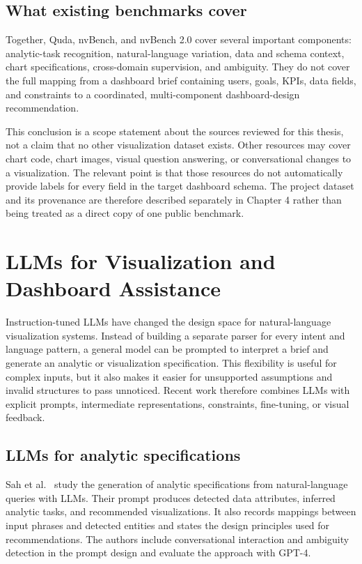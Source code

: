 \subsection{What existing benchmarks cover}

Together, Quda, nvBench, and nvBench 2.0 cover several important components: analytic-task recognition, natural-language variation, data and schema context, chart specifications, cross-domain supervision, and ambiguity. They do not cover the full mapping from a dashboard brief containing users, goals, KPIs, data fields, and constraints to a coordinated, multi-component dashboard-design recommendation.

This conclusion is a scope statement about the sources reviewed for this thesis, not a claim that no other visualization dataset exists. Other resources may cover chart code, chart images, visual question answering, or conversational changes to a visualization. The relevant point is that those resources do not automatically provide labels for every field in the target dashboard schema. The project dataset and its provenance are therefore described separately in Chapter 4 rather than being treated as a direct copy of one public benchmark.

\section{LLMs for Visualization and Dashboard Assistance}

Instruction-tuned LLMs have changed the design space for natural-language visualization systems. Instead of building a separate parser for every intent and language pattern, a general model can be prompted to interpret a brief and generate an analytic or visualization specification. This flexibility is useful for complex inputs, but it also makes it easier for unsupported assumptions and invalid structures to pass unnoticed. Recent work therefore combines LLMs with explicit prompts, intermediate representations, constraints, fine-tuning, or visual feedback.

\subsection{LLMs for analytic specifications}

Sah et al.~\cite{sah2024analytic} study the generation of analytic specifications from natural-language queries with LLMs. Their prompt produces detected data attributes, inferred analytic tasks, and recommended visualizations. It also records mappings between input phrases and detected entities and states the design principles used for recommendations. The authors include conversational interaction and ambiguity detection in the prompt design and evaluate the approach with GPT-4.


